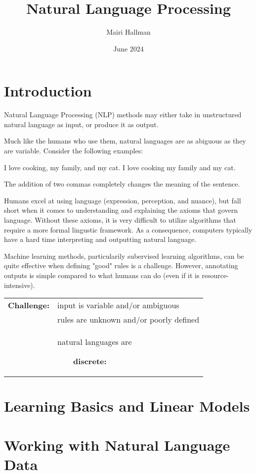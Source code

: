 \documentclass{article}
\title{Natural Language Processing}
\author{Mairi Hallman}
\date{June 2024}
\newcommand{\tabitem}{~~\llap{\textbullet}~~}
\begin{document}
\maketitle

\newpage

\tableofcontents
\newpage

\section{Introduction}

Natural Language Processing (NLP) methods may either take in unstructured natural language as input, or produce it as output.

Much like the humans who use them, natural languages are as abiguous as they are variable. Consider the following examples: %

I love cooking, my family, and my cat.
I love cooking my family and my cat.

The addition of two commas completely changes the meaning of the sentence.

Humans excel at using language (expression, perception, and nuance), but fall short when it comes to understanding and explaining the axioms that govern language. Without these axioms, it is very difficult to utilize algorithms that require a more formal lingustic framework. As a consequence, computers typically have a hard time interpreting and outputting natural language.

Machine learning methods, particularily subervised learning algorithms, can be quite effective when defining "good" rules is a challenge. However, annotating outputs is simple compared to what humans can do (even if it is resource-intensive).

\begin{tabular}{ l l }
  \textbf{Challenge:} & input is variable and/or ambiguous \\
  & rules are unknown and/or poorly defined \\
  & natural languages are
  
  \tabitem \textbf{discrete:}
\end{tabular}

\section{Learning Basics and Linear Models}

\section{Working with Natural Language Data}
\end{document}

